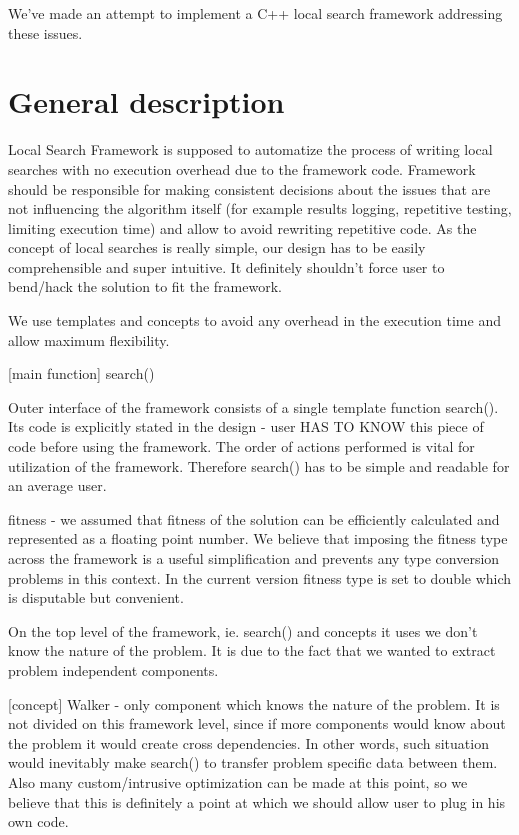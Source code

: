 We've made an attempt to implement a C++ local search 
framework addressing these issues.

\section{General description}

Local Search Framework is supposed to automatize the process of writing local searches with no execution overhead due to the framework code.
Framework should be responsible for making consistent decisions about the issues that are not influencing the algorithm itself
(for example results logging, repetitive testing, limiting execution time) and allow to avoid rewriting repetitive code.
As the concept of local searches is really simple, our design has to be easily comprehensible and super intuitive.
It definitely shouldn't force user to bend/hack the solution to fit the framework.

We use templates and concepts to avoid any overhead in the execution time and allow maximum flexibility.

[main function] search()

Outer interface of the framework consists of a single template function search().
Its code is explicitly stated in the design - user HAS TO KNOW this piece of code before using the framework.
The order of actions performed is vital for utilization of the framework.
Therefore search() has to be simple and readable for an average user.

fitness - we assumed that fitness of the solution can be efficiently calculated and represented as a floating point number.
We believe that imposing the fitness type across the framework is a useful simplification and prevents any type conversion problems in this context.
In the current version fitness type is set to double which is disputable but convenient.

On the top level of the framework, ie. search() and concepts it uses we don't know the nature of the problem.
It is due to the fact that we wanted to extract problem independent components.

[concept] Walker - only component which knows the nature of the problem.
	It is not divided on this framework level, since if more components would know about the problem it would create cross dependencies.
	In other words, such situation would inevitably make search() to transfer problem specific data between them.
	Also many custom/intrusive optimization can be made at this point, so we believe that this is definitely a point at which we should allow user to plug in
	his own code.

